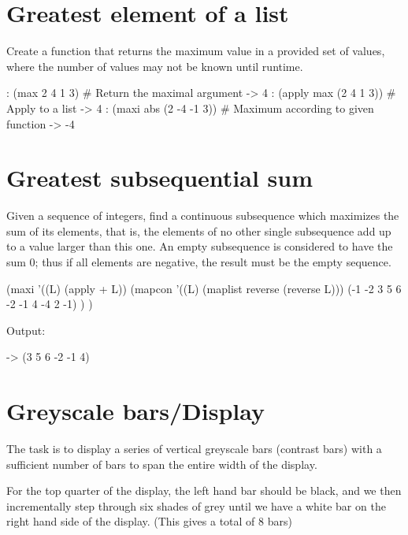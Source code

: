 \pagebreak{}
\section*{Greatest element of a list}

Create a function that returns the maximum value in a provided set of
values, where the number of values may not be known until runtime.

\begin{wideverbatim}

: (max 2 4 1 3)               # Return the maximal argument
-> 4
: (apply max (2 4 1 3))       # Apply to a list
-> 4
: (maxi abs (2 -4 -1 3))      # Maximum according to given function
-> -4

\end{wideverbatim}

\pagebreak{}
\section*{Greatest subsequential sum}

Given a sequence of integers, find a continuous subsequence which
maximizes the sum of its elements, that is, the elements of no other
single subsequence add up to a value larger than this one. An empty
subsequence is considered to have the sum 0; thus if all elements are
negative, the result must be the empty sequence.


\begin{wideverbatim}

(maxi '((L) (apply + L))
   (mapcon '((L) (maplist reverse (reverse L)))
      (-1 -2 3 5 6 -2 -1 4 -4 2 -1) ) )

Output:

-> (3 5 6 -2 -1 4)

\end{wideverbatim}


\pagebreak{}
\section*{Greyscale bars/Display}

The task is to display a series of vertical greyscale bars (contrast
bars) with a sufficient number of bars to span the entire width of the
display.

For the top quarter of the display, the left hand bar should be black,
and we then incrementally step through six shades of grey until we have
a white bar on the right hand side of the display. (This gives a total
of 8 bars)

